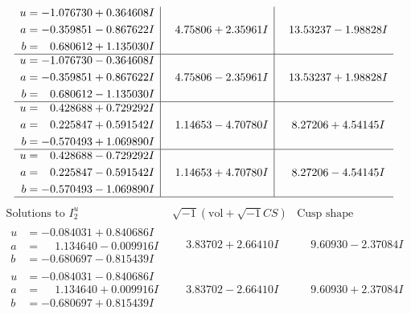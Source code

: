 \documentclass[1p]{elsarticle_modified}
\theoremstyle{definition}
\newcommand{\I}{\sqrt{-1}}
\begin{document}
$$\begin{array}{c|c|c}
\begin{aligned}
u &= -1.076730 + 0.364608 I \\
a &= -0.359851 - 0.867622 I \\
b &= \phantom{-}0.680612 + 1.135030 I\end{aligned}
 & \phantom{-}4.75806 + 2.35961 I & \phantom{-}13.53237 - 1.98828 I \\ \hline\begin{aligned}
u &= -1.076730 - 0.364608 I \\
a &= -0.359851 + 0.867622 I \\
b &= \phantom{-}0.680612 - 1.135030 I\end{aligned}
 & \phantom{-}4.75806 - 2.35961 I & \phantom{-}13.53237 + 1.98828 I \\ \hline\begin{aligned}
u &= \phantom{-}0.428688 + 0.729292 I \\
a &= \phantom{-}0.225847 + 0.591542 I \\
b &= -0.570493 + 1.069890 I\end{aligned}
 & \phantom{-}1.14653 - 4.70780 I & \phantom{-}8.27206 + 4.54145 I \\ \hline\begin{aligned}
u &= \phantom{-}0.428688 - 0.729292 I \\
a &= \phantom{-}0.225847 - 0.591542 I \\
b &= -0.570493 - 1.069890 I\end{aligned}
 & \phantom{-}1.14653 + 4.70780 I & \phantom{-}8.27206 - 4.54145 I\\
 \hline 
 \end{array}$$\newpage$$\begin{array}{c|c|c}  
\text{Solutions to }I^u_{2}& \I (\text{vol} + \sqrt{-1}CS) & \text{Cusp shape}\\
 \hline 
\begin{aligned}
u &= -0.084031 + 0.840686 I \\
a &= \phantom{-}1.134640 - 0.009916 I \\
b &= -0.680697 - 0.815439 I\end{aligned}
 & \phantom{-}3.83702 + 2.66410 I & \phantom{-}9.60930 - 2.37084 I \\ \hline\begin{aligned}
u &= -0.084031 - 0.840686 I \\
a &= \phantom{-}1.134640 + 0.009916 I \\
b &= -0.680697 + 0.815439 I\end{aligned}
 & \phantom{-}3.83702 - 2.66410 I & \phantom{-}9.60930 + 2.37084 I \\ \hline\begin{aligned}

\end{aligned}
\end{array}$$
\end{document}
